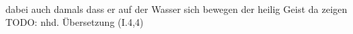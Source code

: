 \begin{exe}
\ex \label{ex:I2244} \gll {}                 \\
{dabei} {auch} {damals} {} {dass} {er} {auf} {der} {Wasser} {sich bewegen} {} {der} {heilig} {Geist} {da} {zeigen} {}\\
\glt TODO: nhd. Übersetzung (I.4,4)
\end{exe}
